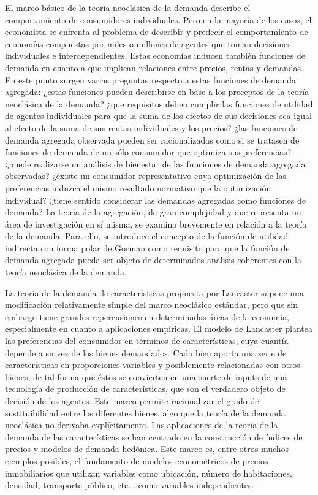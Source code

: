 \documentclass{nuevotema}
\begin{document}
El marco básico de la teoría neoclásica de la demanda describe el comportamiento de consumidores individuales. Pero en la mayoría de los casos, el economista se enfrenta al problema de describir y predecir el comportamiento de economías compuestas por miles o millones de agentes que toman decisiones individuales e interdependientes. Estas economías inducen también funciones de demanda en cuanto a que implican relaciones entre precios, rentas y demandas. En este punto surgen varias preguntas respecto a estas funciones de demanda agregada: ¿estas funciones pueden describirse en base a los preceptos de la teoría neoclásica de la demanda? ¿que requisitos deben cumplir las funciones de utilidad de agentes individuales para que la suma de los efectos de sus decisiones sea igual al efecto de la suma de sus rentas individuales y los precios? ¿las funciones de demanda agregada observada pueden ser racionalizadas como si se tratasen de funciones de demanda de un sólo consumidor que optimiza sus preferencias? ¿puede realizarse un análisis de bienestar de las funciones de demanda agregada observadas? ¿existe un consumidor representativo cuya optimización de las preferencias induzca el mismo resultado normativo que la optimización individual? ¿tiene sentido considerar las  demandas agregadas como funciones de demanda? La teoría de la agregación, de gran complejidad y que representa un área de investigación en sí misma, se examina brevemente en relación a la teoría de la demanda. Para ello, se introduce el concepto de la función de utilidad indirecta con forma polar de Gorman como requisito para que la función de demanda agregada pueda ser objeto de determinados análisis coherentes con la teoría neoclásica de la demanda. 

La teoría de la demanda de características propuesta por Lancaster supone una modificación relativamente simple del marco neoclásico estándar, pero que sin embargo tiene grandes repercusiones en determinadas áreas de la economía, especialmente en cuanto a aplicaciones empíricas. El modelo de Lancaster plantea las preferencias del consumidor en términos de características, cuya cuantía depende a su vez de los bienes demandados. Cada bien aporta una serie de características en proporciones variables y posiblemente relacionadas con otros bienes, de tal forma que éstos se convierten en una suerte de inputs de una tecnología de producción de características, que son el verdadero objeto de decisión de los agentes. Este marco permite racionalizar el grado de sustituibilidad entre los diferentes bienes, algo que la teoría de la demanda neoclásica no derivaba explícitamente. Las aplicaciones de la teoría de la demanda de las características se han centrado en la construcción de índices de precios y modelos de demanda hedónica. Este marco es, entre otros muchos ejemplos posibles, el fundamento de modelos econométricos de precios inmobiliarios que utilizan variables como ubicación, número de habitaciones, densidad, transporte público, etc... como variables independientes.
\end{document}
